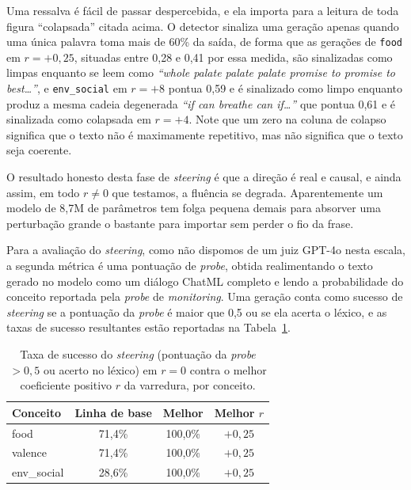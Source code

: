 Uma ressalva é fácil de passar despercebida, e ela importa para a leitura de toda figura
``colapsada'' citada acima. O detector sinaliza uma geração apenas quando uma única
palavra toma mais de 60\% da saída, de forma que as gerações de \verb|food| em
$r = +0{,}25$, situadas entre 0{,}28 e 0{,}41 por essa medida, são sinalizadas como limpas
enquanto se leem como \emph{``whole palate palate palate promise to promise to best\ldots''},
e \verb|env_social| em $r = +8$ pontua 0{,}59 e é sinalizado como limpo enquanto produz a
mesma cadeia degenerada \emph{``if can breathe can if\ldots''} que pontua 0{,}61 e é
sinalizada como colapsada em $r = +4$. Note que um zero na coluna de colapso significa que
o texto não é maximamente repetitivo, mas não significa que o texto seja coerente.

O resultado honesto desta fase de \textit{steering} é que a direção é real e causal, e ainda
assim, em todo $r \neq 0$ que testamos, a fluência se degrada. Aparentemente um modelo de
8{,}7M de parâmetros tem folga pequena demais para absorver uma perturbação grande o
bastante para importar sem perder o fio da frase.

Para a avaliação do \textit{steering}, como não dispomos de um juiz GPT-4o nesta escala, a
segunda métrica é uma pontuação de \textit{probe}, obtida realimentando o texto gerado no
modelo como um diálogo ChatML completo e lendo a probabilidade do conceito reportada pela
\textit{probe} de \textit{monitoring}. Uma geração conta como sucesso de \textit{steering}
se a pontuação da
\textit{probe} é maior que 0{,}5 ou se ela acerta o léxico, e as taxas de sucesso
resultantes estão reportadas na Tabela~\ref{tab:steering_success}.

\begin{table}[htbp]
\centering
\caption{Taxa de sucesso do \textit{steering} (pontuação da \textit{probe} $>0{,}5$ ou acerto no léxico) em $r=0$ contra o melhor coeficiente positivo $r$ da varredura, por conceito.}
\label{tab:steering_success}
\begin{tabular}{@{}lccc@{}}
\toprule
\textbf{Conceito} & \textbf{Linha de base} & \textbf{Melhor} & \textbf{Melhor $r$} \\
\midrule
food        & 71{,}4\% & 100{,}0\% & $+0{,}25$ \\
valence     & 71{,}4\% & 100{,}0\% & $+0{,}25$ \\
env\_social & 28{,}6\% & 100{,}0\% & $+0{,}25$ \\
\bottomrule
\end{tabular}
\end{table}

